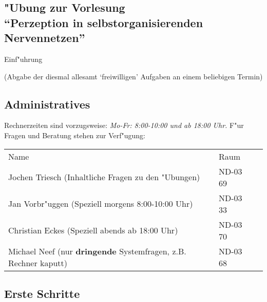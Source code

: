\documentclass{article}
\begin{document}
%




\begin{center}
\setcounter{section}{1}
\setcounter{equation}{0}
\setcounter{subsection}{0}
\section*{"Ubung \thesection{} zur Vorlesung\\ 
 ``Perzeption in selbstorganisierenden Nervennetzen''} 
\centerline{\large Einf"uhrung}
\large (Abgabe der diesmal allesamt `freiwilligen' Aufgaben an einem 
beliebigen Termin)
\end{center}



\subsection{Administratives}

Rechnerzeiten sind vorzugsweise: {\em Mo-Fr: 8:00-10:00 und ab 18:00 Uhr.}
\noindent 
F"ur Fragen und Beratung stehen zur Verf"ugung:

\begin{tabular}{lll}
  Name   & Raum \\
  Jochen Triesch (Inhaltliche Fragen zu den "Ubungen)   
    & ND-03 69 \\
  Jan Vorbr"uggen (Speziell morgens 8:00-10:00 Uhr)
    & ND-03 33 \\
  Christian Eckes (Speziell abends ab 18:00 Uhr)
    & ND-03 70 \\
  Michael Neef (nur {\bf dringende} Systemfragen, z.B. Rechner kaputt)  
    &  ND-03 68 \\
\end{tabular}



\subsection{Erste Schritte}
\end{document}
